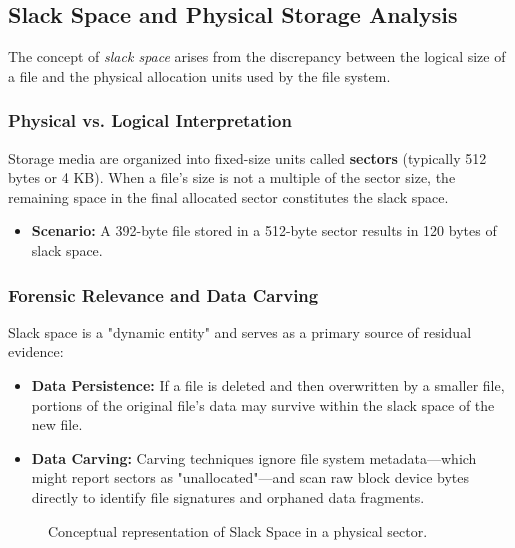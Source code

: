 \subsection{Slack Space and Physical Storage Analysis}
The concept of \textit{slack space} arises from the discrepancy between the logical size of a file and the physical allocation units used by the file system.

\subsubsection*{Physical vs. Logical Interpretation}
Storage media are organized into fixed-size units called \textbf{sectors} (typically 512 bytes or 4 KB). When a file's size is not a multiple of the sector size, the remaining space in the final allocated sector constitutes the slack space.
\begin{itemize}
    \item \textbf{Scenario:} A 392-byte file stored in a 512-byte sector results in 120 bytes of slack space.
\end{itemize}

\subsubsection*{Forensic Relevance and Data Carving}
Slack space is a "dynamic entity" and serves as a primary source of residual evidence:
\begin{itemize}
    \item \textbf{Data Persistence:} If a file is deleted and then overwritten by a smaller file, portions of the original file's data may survive within the slack space of the new file.
    \item \textbf{Data Carving:} Carving techniques ignore file system metadata—which might report sectors as "unallocated"—and scan raw block device bytes directly to identify file signatures and orphaned data fragments.
\end{itemize}

\begin{figure}[H]
\centering
{}
\caption{Conceptual representation of Slack Space in a physical sector.}
\end{figure}

